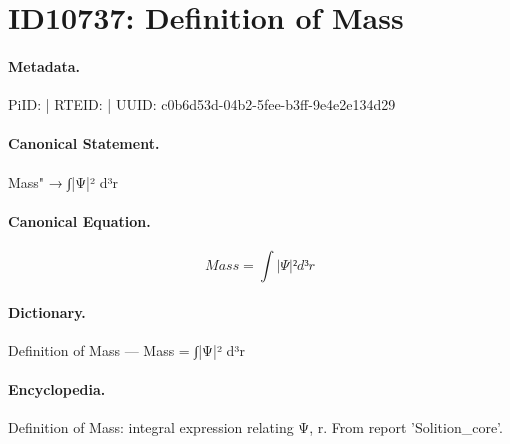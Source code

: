 \section*{ID10737: Definition of Mass}
\paragraph{Metadata.}
PiID:  | RTEID:  | UUID: c0b6d53d-04b2-5fee-b3ff-9e4e2e134d29

\paragraph{Canonical Statement.}
Mass" → ∫|Ψ|² d³r

\paragraph{Canonical Equation.}
\[
Mass = ∫|Ψ|² d³r
\]

\paragraph{Dictionary.}
Definition of Mass — Mass = ∫|Ψ|² d³r

\paragraph{Encyclopedia.}
Definition of Mass: integral expression relating Ψ, r. From report 'Solition\_core'.
